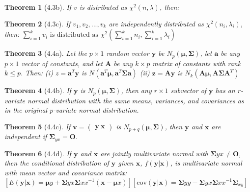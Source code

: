 \documentclass{article}
\newtheorem{theorem}{Theorem}[section]
\begin{document}
\begin{theorem}[4.3b]
If $v$ is distributed as $\chi^2(n,\lambda)$, then:
\begin{enumerate}
    \item $E(v) = n+2\lambda$
    \item $\text{var}(u) = 2n + 8\lambda$
    \item $M_v(t) = \frac{1}{(1-2t)^{n/2}}e^{-\lambda(1-\frac{1}{(1-2t)})}}$
\end{enumerate}
\end{theorem}

\begin{theorem}[4.3c]
If $v_1, v_2, ..., v_k$ are independently distributed as $\chi^2(n_i,\lambda_i)$, then:
$\sum_{i=1}^k v_i \text{ is distributed as } \chi^2(\sum_{i=1}^k n_i, \sum_{i=1}^k \lambda_i)$
\end{theorem}

\begin{theorem}[4.4a]
Let the $p \times 1$ random vector $\mathbf{y}$ be $N_p(\boldsymbol{\mu}, \boldsymbol{\Sigma})$, let $\mathbf{a}$ be any $p \times 1$ vector of constants, and let $\mathbf{A}$ be any $k \times p$ matrix of constants with rank $k \leq p$. Then:
(i) $z = \mathbf{a}^T\mathbf{y}$ is $N(\mathbf{a}^T\boldsymbol{\mu}, \mathbf{a}^T\boldsymbol{\Sigma}\mathbf{a})$
(ii) $\mathbf{z} = \mathbf{A}\mathbf{y}$ is $N_k(\mathbf{A}\boldsymbol{\mu}, \mathbf{A}\boldsymbol{\Sigma}\mathbf{A}^T)$
\end{theorem}

\begin{theorem}[4.4b]
If $\mathbf{y}$ is $N_p(\boldsymbol{\mu}, \boldsymbol{\Sigma})$, then any $r \times 1$ subvector of $\mathbf{y}$ has an $r$-variate normal distribution with the same means, variances, and covariances as in the original $p$-variate normal distribution.
\end{theorem}

\begin{theorem}[4.4c]
If $\mathbf{v} = \begin{pmatrix} \mathbf{y} \ \mathbf{x} \end{pmatrix}$ is $N_{p+q}(\boldsymbol{\mu}, \boldsymbol{\Sigma})$, then $\mathbf{y}$ and $\mathbf{x}$ are independent if $\boldsymbol{\Sigma}_{yx} = \mathbf{O}$.
\end{theorem}

\begin{theorem}[4.4d]
If $\mathbf{y}$ and $\mathbf{x}$ are jointly multivariate normal with $\boldsymbol{\Sigma}{yx} \neq \mathbf{O}$, then the conditional distribution of $\mathbf{y}$ given $\mathbf{x}$, $f(\mathbf{y}|\mathbf{x})$, is multivariate normal with mean vector and covariance matrix:
$[E(\mathbf{y}|\mathbf{x}) = \boldsymbol{\mu}y + \boldsymbol{\Sigma}{yx}\boldsymbol{\Sigma}{xx}^{-1}(\mathbf{x} - \boldsymbol{\mu}x)]
[\text{cov}(\mathbf{y}|\mathbf{x}) = \boldsymbol{\Sigma}{yy} - \boldsymbol{\Sigma}{yx}\boldsymbol{\Sigma}{xx}^{-1}\boldsymbol{\Sigma}_{xy}]$
\end{theorem}
\end{document}
